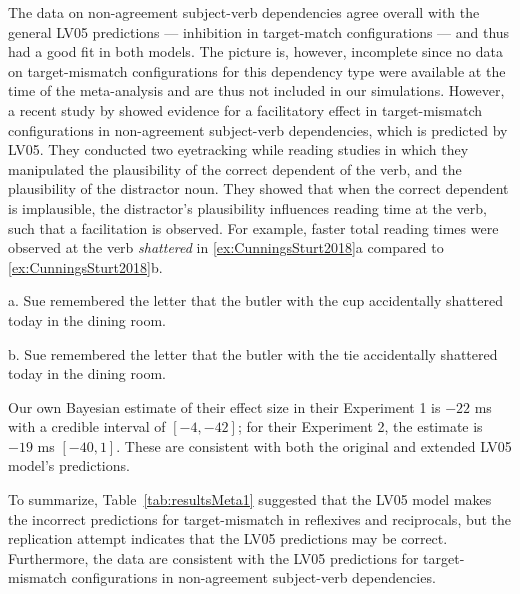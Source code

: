 \documentclass{cambridge7A}\usepackage[]{graphicx}\usepackage[]{color}
\newcommand{\revisedII}[1]{#1}
\begin{document}
The data on non-agreement subject-verb dependencies agree overall with the general LV05 predictions --- inhibition in target-match configurations --- and thus had a good fit in both models. The picture is, however, incomplete since no data on target-mismatch configurations for this dependency type were available at the time of the \cite{JaegerEngelmannVasishth2017} meta-analysis and are thus not included in our simulations.
However, a recent study by \cite{CunningsSturt2018} showed evidence for a facilitatory effect in target-mismatch configurations in non-agreement subject-verb dependencies, which is predicted by LV05. 
They conducted two eyetracking while reading studies in which they manipulated the plausibility of the correct dependent of the verb, and the plausibility of the distractor noun. They showed that when the correct dependent is implausible, the distractor's plausibility influences reading time at the verb, such that a facilitation is observed. 
For example, faster total reading times were observed at the verb \textit{shattered} in \ref{ex:CunningsSturt2018}a compared to \ref{ex:CunningsSturt2018}b. 

\begin{exe}
\ex\label{ex:CunningsSturt2018}
\begin{xlist}
\item[a.] Sue remembered the letter that the butler with the cup accidentally shattered today in the dining room. 
\item[b.] Sue remembered the letter that the butler with the tie accidentally shattered today in the dining room. 
\end{xlist}
\end{exe}

Our own Bayesian estimate of their effect size in their Experiment 1 is $-22$ ms with a credible interval of $[-4,-42]$; for their Experiment 2, the estimate is $-19$ ms $[-40,1]$. These are consistent with both the original and extended LV05 model's predictions.

\revisedII{To summarize, Table~\ref{tab:resultsMeta1} suggested that the LV05 model makes the incorrect predictions for target-mismatch in reflexives and reciprocals, but the \cite{JaegerMertzenVanDykeVasishth2019} replication attempt indicates that the LV05 predictions may be correct. Furthermore, the \cite{CunningsSturt2018} data are consistent with the LV05 predictions for target-mismatch configurations in non-agreement subject-verb dependencies.}
\end{document}
